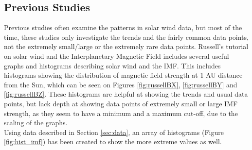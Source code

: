 \documentclass[12pt]{article}
\begin{document}
    \subsection{Previous Studies}\label{sec:prevstudies}
        Previous studies often examine the patterns in solar wind data, but most of the time, these studies only investigate the trends and the fairly common data points, not the extremely small/large or the extremely rare data points. Russell's tutorial on solar wind and the Interplanetary Magnetic Field\cite{2001russell} includes several useful graphs and histograms describing solar wind and the IMF. This includes histograms showing the distribution of magnetic field strength at 1 AU distance from the Sun, which can be seen on Figures \ref{fig:russellBX}, \ref{fig:russellBY} and \ref{fig:russellBZ}. These histograms are helpful at showing the trends and usual data points, but lack depth at showing data points of extremely small or large IMF strength, as they seem to have a minimum and a maximum cut-off, due to the scaling of the graphs.\\
        Using data described in Section \ref{sec:data}, an array of histograms (Figure \ref{fig:hist_imf}) has been created to show the more extreme values as well.\\ \\ 
\end{document}
